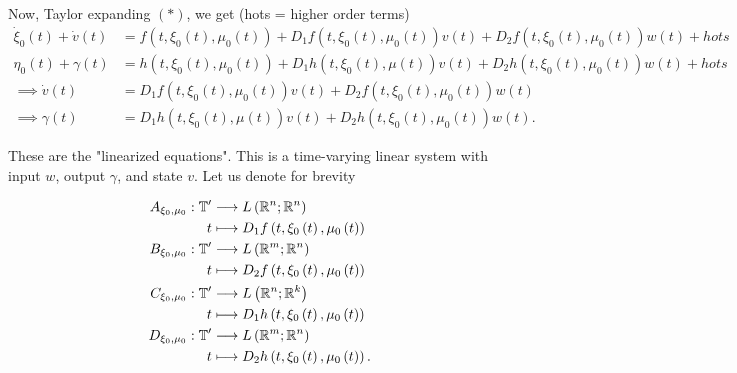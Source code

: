 Now, Taylor expanding $\left( * \right) $, we get (hots = higher order terms)
\begin{align*}
	\dot{\xi} _{0}\left( t \right) + \dot{v}\left( t \right) &= f\left( t, \xi_0 \left( t \right)  , \mu_0 \left( t \right)\right) + D_1 f\left( t, \xi_0 \left( t \right) , \mu_0 \left( t \right)  \right) v\left( t \right) + D_2 f\left( t, \xi_0\left( t \right) , \mu_0\left( t \right)  \right) w\left( t \right) + hots\\
	\eta_0 \left( t \right) + \gamma\left( t \right) &= h\left( t, \xi_0\left( t \right) , \mu_0\left( t \right)  \right)  + D_1 h\left( t, \xi_0 \left( t \right) , \mu\left( t \right)  \right) v\left( t \right) + D_2 h\left( t, \xi_0\left( t \right) , \mu_0\left( t \right)  \right) w\left( t \right) + hots \\
	\implies  \dot{v}\left( t \right) &=  D_1 f\left( t, \xi_0 \left( t \right) , \mu_0 \left( t \right)  \right) v\left( t \right) + D_2 f\left( t, \xi_0\left( t \right) , \mu_0\left( t \right)  \right) w\left( t \right) \\
	\implies \gamma\left( t \right) &=  D_1 h\left( t, \xi_0 \left( t \right) , \mu\left( t \right)  \right) v\left( t \right) + D_2 h\left( t, \xi_0\left( t \right) , \mu_0\left( t \right)  \right) w\left( t \right) 
.\end{align*}

These are the "linearized equations". This is a time-varying linear system with input $w$, output $\gamma$, and state  $v$. Let us denote for brevity

\begin{align*}
	A_{\xi_0, \mu_0}: \mathbb{T} ' &\longrightarrow L\left( \mathbb{R}^{n}; \mathbb{R}^{n} \right)  \\
	t &\longmapsto D_1 f\left( t, \xi_0 \left( t \right) , \mu_0 \left( t \right)  \right)  \\
	B_{\xi_0, \mu_0}: \mathbb{T} ' &\longrightarrow L\left( \mathbb{R}^{m}; \mathbb{R}^{n} \right)  \\
	t &\longmapsto D_2 f\left( t, \xi_0 \left( t \right) , \mu_0 \left( t \right)  \right)  \\
	C_{\xi_0, \mu_0}: \mathbb{T} ' &\longrightarrow L\left( \mathbb{R}^{n}; \mathbb{R}^{k} \right)  \\
	t &\longmapsto D_1 h\left( t, \xi_0 \left( t \right) , \mu_0 \left( t \right)  \right)  \\
	D_{\xi_0, \mu_0}: \mathbb{T} ' &\longrightarrow L\left( \mathbb{R}^{m}; \mathbb{R}^{n} \right)  \\
	t &\longmapsto D_2 h\left( t, \xi_0 \left( t \right) , \mu_0 \left( t \right)  \right)  
.\end{align*}

